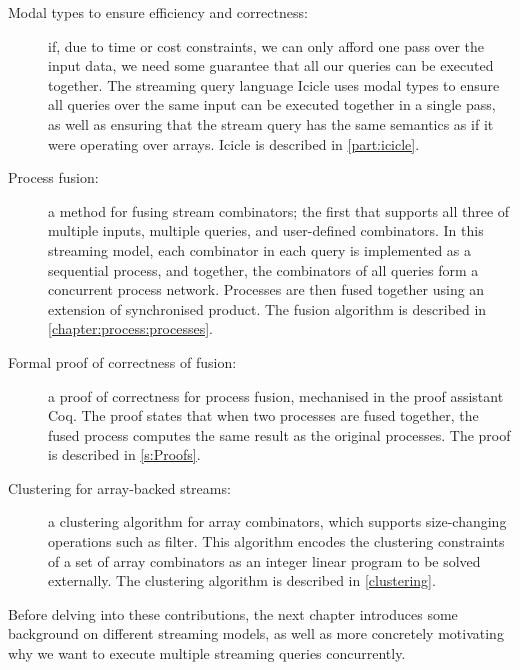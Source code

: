 \begin{description}
\item[Modal types to ensure efficiency and correctness:]
if, due to time or cost constraints, we can only afford one pass over the input data, we need some guarantee that all our queries can be executed together.
The streaming query language Icicle uses modal types to ensure all queries over the same input can be executed together in a single pass, as well as ensuring that the stream query has the same semantics as if it were operating over arrays.
Icicle is described in \cref{part:icicle}.


\item[Process fusion:]
a method for fusing stream combinators; the first that supports all three of multiple inputs, multiple queries, and user-defined combinators.
In this streaming model, each combinator in each query is implemented as a sequential process, and together, the combinators of all queries form a concurrent process network.
Processes are then fused together using an extension of synchronised product.
The fusion algorithm is described in \cref{chapter:process:processes}.

\item[Formal proof of correctness of fusion:]
a proof of correctness for process fusion, mechanised in the proof assistant Coq.
The proof states that when two processes are fused together, the fused process computes the same result as the original processes.
The proof is described in \cref{s:Proofs}.

\item[Clustering for array-backed streams:]
a clustering algorithm for array combinators, which supports size-changing operations such as filter.
This algorithm encodes the clustering constraints of a set of array combinators as an integer linear program to be solved externally.
The clustering algorithm is described in \cref{clustering}.

\end{description}

Before delving into these contributions, the next chapter introduces some background on different streaming models, as well as more concretely motivating why we want to execute multiple streaming queries concurrently.

